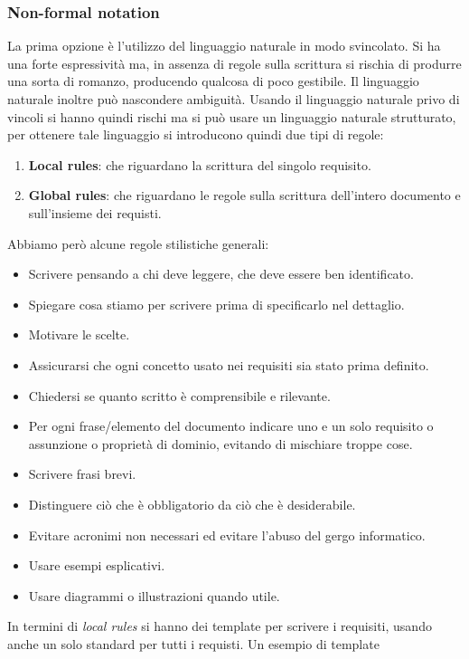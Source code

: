 \subsubsection{Non-formal notation}
La prima opzione è l'utilizzo del linguaggio naturale in modo svincolato. Si ha
una forte espressività ma, in assenza di regole sulla scrittura si rischia di
produrre una sorta di romanzo, producendo qualcosa di poco gestibile. Il linguaggio
naturale inoltre può nascondere ambiguità. Usando il linguaggio naturale privo
di vincoli si hanno quindi rischi ma si può usare un linguaggio naturale strutturato,
per ottenere tale linguaggio si introducono quindi due tipi di regole:
\begin{enumerate}
      \item \textbf{Local rules}: che riguardano la scrittura del singolo requisito.
      \item \textbf{Global rules}: che riguardano le regole sulla scrittura
            dell'intero documento e sull'insieme dei requisti.
\end{enumerate}
Abbiamo però alcune regole stilistiche generali:
\begin{itemize}
      \item Scrivere pensando a chi deve leggere, che deve essere ben identificato.
      \item Spiegare cosa stiamo per scrivere prima di specificarlo nel dettaglio.
      \item Motivare le scelte.
      \item Assicurarsi che ogni concetto usato nei requisiti sia stato prima definito.
      \item Chiedersi se quanto scritto è comprensibile e rilevante.
      \item Per ogni frase/elemento del documento indicare uno e un solo requisito
            o assunzione o proprietà di dominio, evitando di mischiare troppe cose.
      \item Scrivere frasi brevi.
      \item Distinguere ciò che è obbligatorio da ciò che è desiderabile.
      \item Evitare acronimi non necessari ed evitare l'abuso del gergo informatico.
      \item Usare esempi esplicativi.
      \item Usare diagrammi o illustrazioni quando utile.
\end{itemize}
In termini di \textit{local rules} si hanno dei template per scrivere i requisiti,
usando anche un solo standard per tutti i requisti. Un esempio di template
